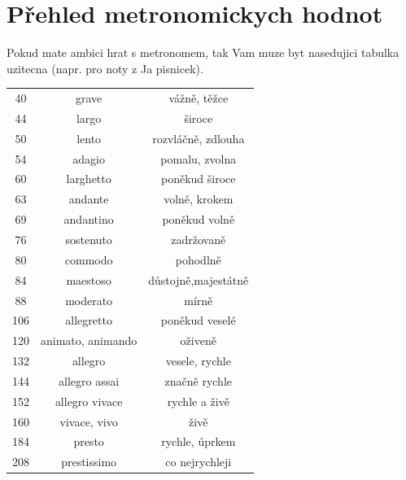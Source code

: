 \documentclass[twoside,12pt,a5paper]{article}
\begin{document}
\section{Přehled metronomickych hodnot}
Pokud mate ambici hrat s metronomem, tak Vam muze byt nasedujici tabulka uzitecna (napr. pro noty z Ja pisnicek).
\begin{center}
\begin{tabular}{ c|c|c } 
40&grave&vážně, těžce\\
44&largo&široce\\
50&lento&rozvláčně, zdlouha\\
54&adagio&pomalu, zvolna\\
60&larghetto&poněkud široce\\
63&andante&volně, krokem\\
69&andantino&poněkud volně\\
76&sostenuto&zadržovaně\\
80&commodo&pohodlně\\
84&maestoso&důstojně,majestátně\\
88&moderato&mírně\\
106&allegretto&poněkud veselé\\
120&animato, animando&oživeně\\
132&allegro&vesele, rychle\\
144&allegro assai&značně rychle\\
152&allegro vivace &rychle a živě\\
160&vivace, vivo&živě\\
184&presto&rychle, úprkem\\
208&prestissimo&co nejrychleji\\
\end{tabular}
\end{center}
\end{document}
